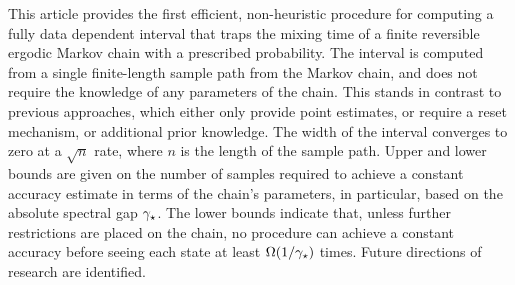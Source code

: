 This article provides the first efficient, non-heuristic procedure for computing a fully data dependent interval
that traps the mixing time of a finite reversible ergodic Markov chain with a prescribed probability.
The interval is computed from a single finite-length sample
path from the Markov chain, and does not require the 
knowledge of any parameters of the chain.
This stands in contrast to previous approaches, which either 
only provide point estimates, or require a
reset mechanism, or additional prior knowledge.
The width of the interval converges to zero at a
$\sqrt{n}$ rate, where $n$ is the length of the sample path.
Upper and lower bounds are given on the number of samples required
to achieve a constant accuracy estimate in terms of the chain's parameters,
in particular, based on the absolute spectral gap $\gamma_{\star}$.
The lower bounds indicate that, 
unless further restrictions are placed on the chain,
no procedure can achieve a constant
accuracy before seeing each state at least  $\Omega(1/\gamma_{\star})$ times.
Future directions of research are identified.


%
%
